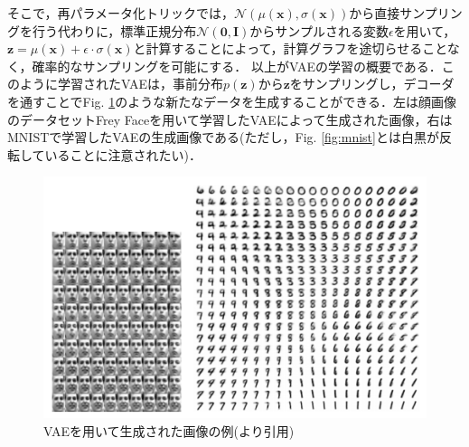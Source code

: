 そこで，再パラメータ化トリックでは，$\mathcal{N}(\mu (\bm{x}), \sigma (\bm{x}))$から直接サンプリングを行う代わりに，標準正規分布$\mathcal{N}(\bm{0},\bm{I})$からサンプルされる変数$\epsilon$を用いて，$\bm{z}=\mu (\bm{x})+ \epsilon \cdot \sigma (\bm{x})$と計算することによって，計算グラフを途切らせることなく，確率的なサンプリングを可能にする．
以上がVAEの学習の概要である．このように学習されたVAEは，事前分布$p(\bm{z})$から$\bm{z}$をサンプリングし，デコーダを通すことでFig. \ref{fig:vae}のような新たなデータを生成することができる．左は顔画像のデータセットFrey Faceを用いて学習したVAEによって生成された画像，右はMNISTで学習したVAEの生成画像である(ただし，Fig. \ref{fig:mnist}とは白黒が反転していることに注意されたい)．

\begin{figure}[tbp]
  \begin{center}
    \includegraphics[width=\linewidth]{./figures/vae.png}
    \caption{VAEを用いて生成された画像の例(\cite{vae}より引用)}
    \label{fig:vae}
  \end{center}
\end{figure}

